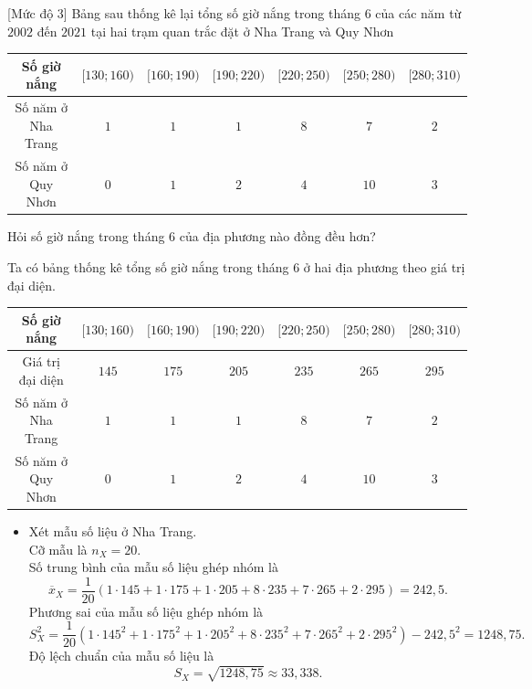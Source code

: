 \begin{bt}%
[Mức độ 3]%
	Bảng sau thống kê lại tổng số giờ nắng trong tháng $6$ của các năm từ $2002$ đến $2021$ tại hai trạm quan trắc đặt ở Nha Trang và Quy Nhơn
	\begin{center}
		\begin{tabular}{|c|c|c|c|c|c|c|}
			\hline
			Số giờ nắng &$[130;160)$  & $[160;190)$ & $[190;220)$ & $[220;250)$ & $[250;280)$ & $[280;310)$\\
			\hline
			Số năm ở Nha Trang	& $1$ & $1$ & $1$ & $8$ & $7$ & $2$\\
			\hline
			Số năm ở Quy Nhơn & $0$ & $1$ & $2$ & $4$ & $10$ & $3$\\
			\hline
		\end{tabular}
	\end{center}
	Hỏi số giờ nắng trong tháng $6$ của địa phương nào đồng đều hơn?
	\loigiai 
	{
		Ta có bảng thống kê tổng số giờ nắng trong tháng 6 ở hai địa phương theo giá trị đại diện.
		\begin{center}
			\begin{tabular}{|c|c|c|c|c|c|c|}
				\hline
				Số giờ nắng &$[130;160)$  & $[160;190)$ & $[190;220)$ & $[220;250)$ & $[250;280)$ & $[280;310)$\\
				\hline
				Giá trị đại diện &$145$  & $175$ & $205$ & $235$ & $265$ & $295$\\
				\hline
				Số năm ở Nha Trang	& $1$ & $1$ & $1$ & $8$ & $7$ & $2$ \\
				\hline
				Số năm ở Quy Nhơn & $0$ & $1$ & $2$ & $4$ & $10$ & $3$ \\
				\hline
			\end{tabular}
		\end{center}
		\begin{itemize}
			\item Xét mẫu số liệu ở Nha Trang.\\
			Cỡ mẫu là $n_X=20$.\\
			Số trung bình của mẫu số liệu ghép nhóm là 
			$$\overline{x}_X=\dfrac{1}{20}\left(1\cdot 145+1\cdot 175+1\cdot 205+8\cdot 235+7\cdot 265+2\cdot 295\right)=242{,}5.$$
			Phương sai của mẫu số liệu ghép nhóm là
			$$S^2_X=\dfrac{1}{20}\left(1\cdot 145^2+1\cdot 175^2+1\cdot 205^2+8\cdot 235^2+7\cdot 265^2+2\cdot 295^2\right)-242{,}5^2=1248{,}75.$$
			Độ lệch chuẩn của mẫu số liệu là 
			$$S_X=\sqrt{1248{,}75}\approx 33{,}338.$$

\end{itemize}}
\end{bt}
